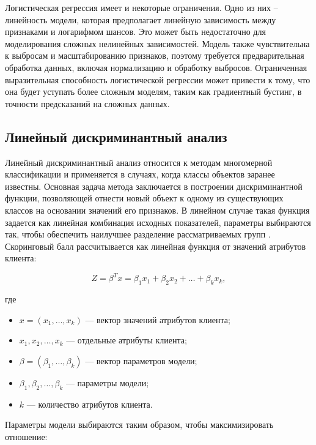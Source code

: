 Логистическая регрессия имеет и некоторые ограничения. Одно из них -- линейность модели, которая предполагает линейную зависимость между признаками и логарифмом шансов. Это может быть недостаточно для моделирования сложных нелинейных зависимостей. Модель также чувствительна к выбросам и масштабированию признаков, поэтому требуется предварительная обработка данных, включая нормализацию и обработку выбросов. Ограниченная выразительная способность логистической регрессии может привести к тому, что она будет уступать более сложным моделям, таким как градиентный бустинг, в точности предсказаний на сложных данных.


\subsection{Линейный дискриминантный анализ}

Линейный дискриминантный анализ относится к методам многомерной классификации и применяется в случаях, когда классы объектов заранее известны. Основная задача метода заключается в построении дискриминантной функции, позволяющей отнести новый объект к одному из существующих классов на основании значений его признаков. В линейном случае такая функция задается как линейная комбинация исходных показателей, параметры выбираются так, чтобы обеспечить наилучшее разделение рассматриваемых групп \cite{OrlovaDiscriminantAnalysis}. Скоринговый балл рассчитывается как линейная функция от значений атрибутов клиента:

\begin{equation}
  Z = \beta^T x = \beta_1 x_1 + \beta_2 x_2 + \ldots + \beta_k x_k,
\end{equation}

где

\begin{itemize}
  \item $x = (x_1, \ldots, x_k)$ --- вектор значений атрибутов клиента;
  \item $x_1, x_2, \ldots, x_k$ --- отдельные атрибуты клиента;
  \item $\beta = (\beta_1, \ldots, \beta_k)$ --- вектор параметров модели;
  \item $\beta_1, \beta_2, \ldots, \beta_k$ --- параметры модели;
  \item $k$ --- количество атрибутов клиента.
\end{itemize}


\newpage
Параметры модели выбираются таким образом, чтобы максимизировать отношение:


